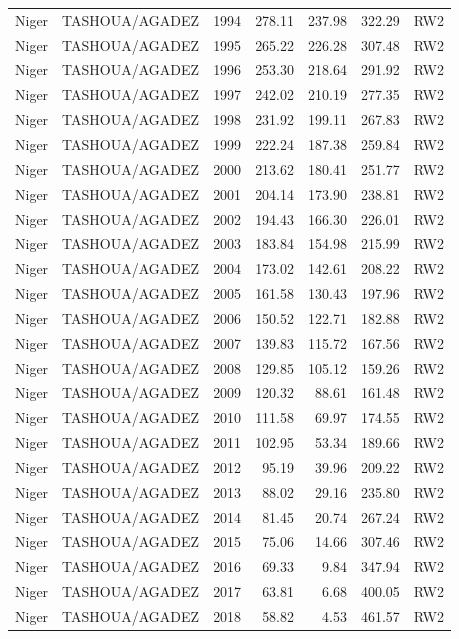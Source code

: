 \begin{longtable}{lllrrrl}
  Niger & TASHOUA/AGADEZ & 1994 & 278.11 & 237.98 & 322.29 & RW2 \\ 
  Niger & TASHOUA/AGADEZ & 1995 & 265.22 & 226.28 & 307.48 & RW2 \\ 
  Niger & TASHOUA/AGADEZ & 1996 & 253.30 & 218.64 & 291.92 & RW2 \\ 
  Niger & TASHOUA/AGADEZ & 1997 & 242.02 & 210.19 & 277.35 & RW2 \\ 
  Niger & TASHOUA/AGADEZ & 1998 & 231.92 & 199.11 & 267.83 & RW2 \\ 
  Niger & TASHOUA/AGADEZ & 1999 & 222.24 & 187.38 & 259.84 & RW2 \\ 
  Niger & TASHOUA/AGADEZ & 2000 & 213.62 & 180.41 & 251.77 & RW2 \\ 
  Niger & TASHOUA/AGADEZ & 2001 & 204.14 & 173.90 & 238.81 & RW2 \\ 
  Niger & TASHOUA/AGADEZ & 2002 & 194.43 & 166.30 & 226.01 & RW2 \\ 
  Niger & TASHOUA/AGADEZ & 2003 & 183.84 & 154.98 & 215.99 & RW2 \\ 
  Niger & TASHOUA/AGADEZ & 2004 & 173.02 & 142.61 & 208.22 & RW2 \\ 
  Niger & TASHOUA/AGADEZ & 2005 & 161.58 & 130.43 & 197.96 & RW2 \\ 
  Niger & TASHOUA/AGADEZ & 2006 & 150.52 & 122.71 & 182.88 & RW2 \\ 
  Niger & TASHOUA/AGADEZ & 2007 & 139.83 & 115.72 & 167.56 & RW2 \\ 
  Niger & TASHOUA/AGADEZ & 2008 & 129.85 & 105.12 & 159.26 & RW2 \\ 
  Niger & TASHOUA/AGADEZ & 2009 & 120.32 & 88.61 & 161.48 & RW2 \\ 
  Niger & TASHOUA/AGADEZ & 2010 & 111.58 & 69.97 & 174.55 & RW2 \\ 
  Niger & TASHOUA/AGADEZ & 2011 & 102.95 & 53.34 & 189.66 & RW2 \\ 
  Niger & TASHOUA/AGADEZ & 2012 & 95.19 & 39.96 & 209.22 & RW2 \\ 
  Niger & TASHOUA/AGADEZ & 2013 & 88.02 & 29.16 & 235.80 & RW2 \\ 
  Niger & TASHOUA/AGADEZ & 2014 & 81.45 & 20.74 & 267.24 & RW2 \\ 
  Niger & TASHOUA/AGADEZ & 2015 & 75.06 & 14.66 & 307.46 & RW2 \\ 
  Niger & TASHOUA/AGADEZ & 2016 & 69.33 & 9.84 & 347.94 & RW2 \\ 
  Niger & TASHOUA/AGADEZ & 2017 & 63.81 & 6.68 & 400.05 & RW2 \\ 
  Niger & TASHOUA/AGADEZ & 2018 & 58.82 & 4.53 & 461.57 & RW2 \\ 

\end{longtable}
